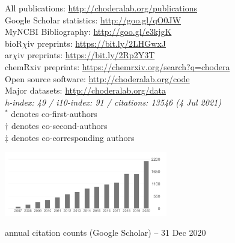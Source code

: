 \documentclass[10pt]{article}
\begin{document}
\begin{minipage}[t]{3.2in}
All publications: \href{http://choderalab.org/publications}{http://choderalab.org/publications} \\
Google Scholar statistics: \href{http://goo.gl/qO0JW}{http://goo.gl/qO0JW} \hspace{0.2in} \\
MyNCBI Bibliography: \href{http://goo.gl/e3kjgK}{http://goo.gl/e3kjgK} \\
bioR$\chi$iv preprints: \href{https://bit.ly/2LHGwxJ}{https://bit.ly/2LHGwxJ} \\
ar$\chi$iv preprints: \href{https://bit.ly/2Rp2Y3T}{https://bit.ly/2Rp2Y3T} \\
chemRxiv preprints: \href{https://chemrxiv.org/search?q=chodera}{https://chemrxiv.org/search?q=chodera} \\
Open source software: \href{http://choderalab.org/code}{http://choderalab.org/code}\\
Major datasets: \href{http://choderalab.org/data}{http://choderalab.org/data} \\
{\small \it h-index: 49 / i10-index: 91 / citations: 13546 (4 Jul 2021)} \\
{\scriptsize $^*$ denotes co-first-authors \\
$\dag$ denotes co-second-authors \\
$\ddag$ denotes co-corresponding authors}
\end{minipage}
\quad
\begin{minipage}[t]{3in}

\includegraphics[width=2.8in,valign=t]{thumbnails/citations-2020-12-31.png}

\vspace{0.05in}
{\small annual citation counts (Google Scholar) -- 31 Dec 2020}
\end{minipage}



\end{document}
